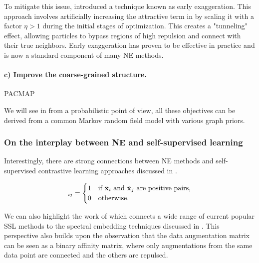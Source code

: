To mitigate this issue, \citet{van2008visualizing} introduced a technique known as early exaggeration. This approach involves artificially increasing the attractive term in  by scaling it with a factor $\eta > 1$ during the initial stages of optimization. This creates a "tunneling" effect, allowing particles to bypass regions of high repulsion and connect with their true neighbors. Early exaggeration has proven to be effective in practice and is now a standard component of many NE methods.


\paragraph{c) Improve the coarse-grained structure.}



\begin{remark}
    PACMAP
\end{remark}


We will see in  \citep{van2022probabilistic} from a probabilistic point of view, all these objectives can be derived from a common Markov random field model with various graph priors.


\subsubsection{On the interplay between NE and self-supervised learning}
Interestingly, there are strong connections between NE methods and self-supervised contrastive learning approaches discussed in . 

\cite{wang2020understanding}
\citep{hu2022your}

\begin{align}
[\tilde{\mP}]_{ij} = 
\begin{cases}
1 & \text{if } \tilde{\vx}_i \text{ and } \tilde{\vx}_j \text{ are positive pairs,} \\
0 & \text{otherwise.}
\end{cases}
\end{align}

We can also highlight the work of \citet{balestriero2022contrastive} which connects a wide range of current popular SSL methods to the spectral embedding techniques discussed in . This perspective also builds upon the observation that the data augmentation matrix can be seen as a binary affinity matrix, where only augmentations from the same data point are connected and the others are repulsed.
